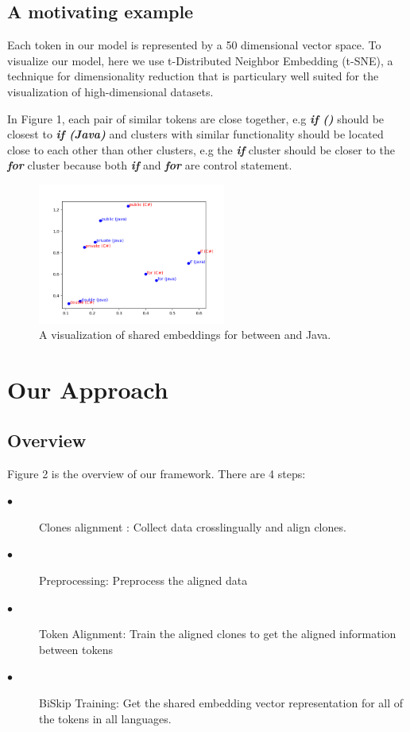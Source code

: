 \subsection{A motivating example}
Each token in our model is represented by a 50 dimensional vector space. To visualize our model, here we use t-Distributed Neighbor Embedding (t-SNE), a technique for dimensionality reduction that is particulary well suited for the visualization of high-dimensional datasets. 

In Figure 1, each pair of similar tokens are close together, e.g \textit{\textbf{if ()}} should be closest to \textit{\textbf{if (Java)}} and clusters with similar functionality should be located close to each other than other clusters, e.g the \textit{\textbf{if}} cluster should be closer to the \textit{\textbf{for}} cluster because both \textit{\textbf{if}} and \textit{\textbf{for}} are control statement.

\begin{figure}[t!]
	\includegraphics[width=0.55\textwidth]{example_bi2vec_tsne}
	\caption{A visualization of shared embeddings for between  and Java.}
	\label{fig:clf}
\end{figure}

\section{Our Approach}
\subsection{Overview}
Figure 2 is the overview of our framework. There are 4 steps:
\begin{description}
	\item [$\bullet$] Clones alignment : Collect data crosslingually and align clones.
	\item [$\bullet$] Preprocessing: Preprocess the aligned data
	\item [$\bullet$] Token Alignment: Train the aligned clones to get the aligned information between tokens
	\item [$\bullet$] BiSkip Training: Get the shared embedding vector representation for all of the tokens in all languages.
\end{description}

